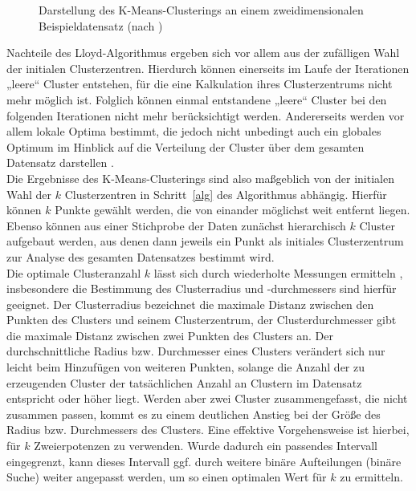 \documentclass[a4paper,12pt,twoside]{article}
\begin{document}
\begin{figure}[!htb]
	\hfill
	\begin{minipage}[hbt]{6cm}
		\leftskip=1.3cm
	\end{minipage}
	\hfill
	\hfill\null
	\caption[Kantengraph]{
		Darstellung des K-Means-Clusterings an einem zweidimensionalen Beispieldatensatz (nach \citet{jain2010}) 
	}
	\label{fig:2}
\end{figure}

Nachteile des Lloyd-Algorithmus ergeben sich vor allem aus der zufälligen Wahl der initialen Clusterzentren. Hierdurch können einerseits im Laufe der Iterationen „leere“ Cluster entstehen, für die eine Kalkulation ihres Clusterzentrums nicht mehr möglich ist. Folglich können einmal entstandene „leere“ Cluster bei den folgenden Iterationen nicht mehr berücksichtigt werden. Andererseits werden vor allem lokale Optima bestimmt, die jedoch nicht unbedingt auch ein globales Optimum im Hinblick auf die Verteilung der Cluster über dem gesamten Datensatz darstellen \citep{Moris2013}.
\\

Die Ergebnisse des K-Means-Clusterings sind also maßgeblich von der initialen Wahl der $k$ Clusterzentren in Schritt~\ref{alg} des Algorithmus abhängig. Hierfür können $k$ Punkte gewählt werden, die von einander möglichst weit entfernt liegen. Ebenso können aus einer Stichprobe der Daten zunächst hierarchisch $k$ Cluster aufgebaut werden, aus denen dann jeweils ein Punkt als initiales Clusterzentrum zur Analyse des gesamten Datensatzes bestimmt wird. 
\\
\newpage
Die optimale Clusteranzahl $k$ lässt sich durch wiederholte Messungen ermitteln \citep{Moris2013}, insbesondere die Bestimmung des Clusterradius und -durchmessers sind hierfür geeignet. Der Clusterradius bezeichnet die maximale Distanz zwischen den Punkten des Clusters und seinem Clusterzentrum, der Clusterdurchmesser gibt die maximale Distanz zwischen zwei Punkten des Clusters an. Der durchschnittliche Radius bzw. Durchmesser eines Clusters verändert sich nur leicht beim Hinzufügen von weiteren Punkten, solange die Anzahl der zu erzeugenden Cluster der tatsächlichen Anzahl an Clustern im Datensatz entspricht oder höher liegt. Werden aber zwei Cluster zusammengefasst, die nicht zusammen passen, kommt es zu einem deutlichen Anstieg bei der Größe des Radius bzw. Durchmessers des Clusters. Eine effektive Vorgehensweise ist hierbei, für $ k $ Zweierpotenzen zu verwenden. Wurde dadurch ein passendes Intervall eingegrenzt, kann dieses Intervall ggf. durch weitere binäre Aufteilungen (binäre Suche) weiter angepasst werden, um so einen optimalen Wert für $ k $ zu ermitteln.
\end{document}
